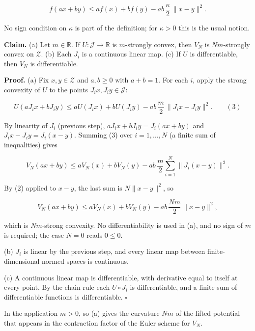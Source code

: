\documentclass[11pt,a4paper]{article}
\begin{document}
\[f(ax+by)\le af(x)+bf(y)-ab\,\frac\kappa2\,\|x-y\|^2 .\]


No sign condition on \(\kappa\) is part of the definition; for \(\kappa>0\) this is the usual notion.




\textbf{Claim.} (a) Let \(m\in\mathbb R\). If \(U:\mathcal J\to\mathbb R\) is \(m\)-strongly convex, then \(V_N\) is \(Nm\)-strongly convex on \(\mathcal Z\). (b) Each \(J_i\) is a continuous linear map. (c) If \(U\) is differentiable, then \(V_N\) is differentiable.




\textbf{Proof.} (a) Fix \(x,y\in\mathcal Z\) and \(a,b\ge0\) with \(a+b=1\). For each \(i\), apply the strong convexity of \(U\) to the points \(J_ix,J_iy\in\mathcal J\):


\[U(aJ_ix+bJ_iy)\le aU(J_ix)+bU(J_iy)-ab\,\frac m2\,\|J_ix-J_iy\|^2 .\qquad(3)\]


By linearity of \(J_i\) (previous step), \(aJ_ix+bJ_iy=J_i(ax+by)\) and \(J_ix-J_iy=J_i(x-y)\). Summing (3) over \(i=1,\dots,N\) (a finite sum of inequalities) gives


\[V_N(ax+by)\le aV_N(x)+bV_N(y)-ab\,\frac m2\sum_{i=1}^N\|J_i(x-y)\|^2 .\]


By (2) applied to \(x-y\), the last sum is \(N\|x-y\|^2\), so


\[V_N(ax+by)\le aV_N(x)+bV_N(y)-ab\,\frac{Nm}2\,\|x-y\|^2,\]


which is \(Nm\)-strong convexity. No differentiability is used in (a), and no sign of \(m\) is required; the case \(N=0\) reads \(0\le0\).




(b) \(J_i\) is linear by the previous step, and every linear map between finite-dimensional normed spaces is continuous.




(c) A continuous linear map is differentiable, with derivative equal to itself at every point. By the chain rule each \(U\circ J_i\) is differentiable, and a finite sum of differentiable functions is differentiable. \(\square\)




In the application \(m>0\), so (a) gives the curvature \(Nm\) of the lifted potential that appears in the contraction factor of the Euler scheme for \(V_N\).
\end{document}
